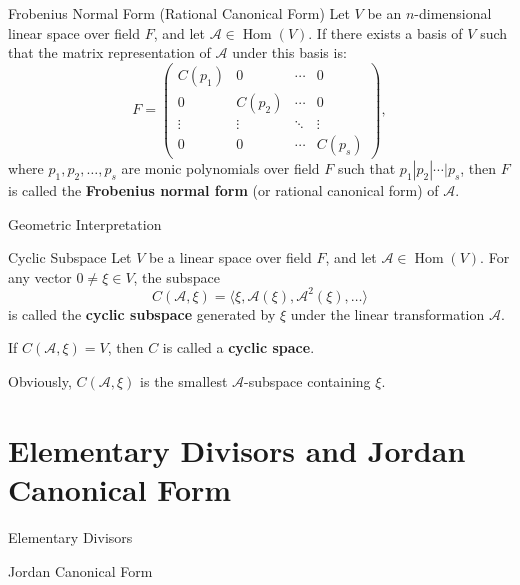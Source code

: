 \documentclass[11pt]{../../TexTemplate/elegantbook} %
\begin{document}
\begin{definition}{Frobenius Normal Form (Rational Canonical Form)}
    Let \( V \) be an \( n \)-dimensional linear space over field \( F \),
    and let \( \mathcal{A}\in \operatorname{Hom}(V) \).
    If there exists a basis of \( V \) such that the matrix representation of \( \mathcal{A} \) under this basis is:
    \[
    F = 
    \begin{pmatrix}
        C(p_1) & 0 & \cdots & 0 \\
        0 & C(p_2) & \cdots & 0 \\
        \vdots & \vdots & \ddots & \vdots \\
        0 & 0 & \cdots & C(p_s)
    \end{pmatrix},
    \]
    where \( p_1, p_2, \dots, p_s \) are monic polynomials over field \( F \) such that
    \( p_1 | p_2 | \cdots | p_s \),
    then \( F \) is called the \textbf{Frobenius normal form} (or rational canonical form) of \( \mathcal{A} \).
\end{definition}

\begin{leftbarTitle}{Geometric Interpretation}\end{leftbarTitle} %
\begin{definition}{Cyclic Subspace}
    Let \( V \) be a linear space over field \( F \),
    and let \( \mathcal{A}\in \operatorname{Hom}(V) \).
    For any vector \(0 \neq \xi \in V \), the subspace
    \[
    C(\mathcal{A}, \xi) = \langle \xi, \mathcal{A}(\xi), \mathcal{A}^{2}(\xi), \ldots \rangle
    \]
    is called the \textbf{cyclic subspace} generated by \( \xi \) under the linear transformation \( \mathcal{A} \).

    If \(C(\mathcal{A}, \xi) = V\), then \( C \) is called a \textbf{cyclic space}.
\end{definition}
Obviously, \( C(\mathcal{A}, \xi) \) is the smallest \( \mathcal{A} \)-subspace containing \( \xi \).


\section{Elementary Divisors and Jordan Canonical Form}
\begin{leftbarTitle}{Elementary Divisors}\end{leftbarTitle}

\begin{leftbarTitle}{Jordan Canonical Form}\end{leftbarTitle}
\end{document}
